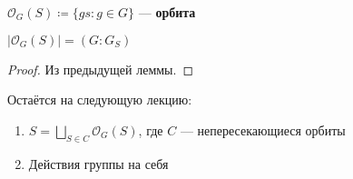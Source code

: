 \begin{definition}
    \(\mathcal{O}_G(S) \coloneqq \{gs : g \in G\}\) --- \textbf{орбита}
\end{definition}

\begin{lemma}
    \(|\mathcal{O}_G(S)| = (G : G_S)\)
\end{lemma}
\begin{proof}
    Из предыдущей леммы.
\end{proof}

Остаётся на следующую лекцию:
\begin{enumerate}
    \item \(S = \bigsqcup_{S \in C} \mathcal{O}_G(S)\), где \(C\) --- непересекающиеся орбиты
    \item Действия группы на себя
\end{enumerate}
